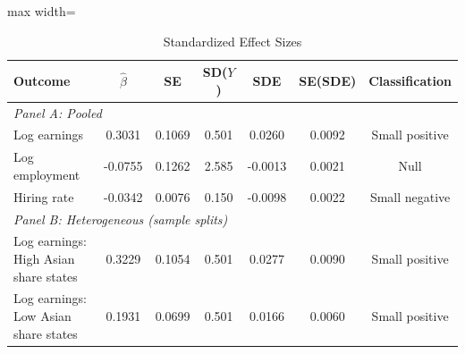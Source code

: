 \begin{table}[H]
\centering
\caption{Standardized Effect Sizes}
\begin{threeparttable}
\begin{adjustbox}{max width=\textwidth}
\begin{tabular}{lcccccc}
\toprule
Outcome & $\hat{\beta}$ & SE & SD($Y$) & SDE & SE(SDE) & Classification \\
\midrule
\multicolumn{7}{l}{\textit{Panel A: Pooled}} \\
Log earnings & 0.3031 & 0.1069 & 0.501 & 0.0260 & 0.0092 & Small positive \\
Log employment & -0.0755 & 0.1262 & 2.585 & -0.0013 & 0.0021 & Null \\
Hiring rate & -0.0342 & 0.0076 & 0.150 & -0.0098 & 0.0022 & Small negative \\
\midrule
\multicolumn{7}{l}{\textit{Panel B: Heterogeneous (sample splits)}} \\
Log earnings: High Asian share states & 0.3229 & 0.1054 & 0.501 & 0.0277 & 0.0090 & Small positive \\
Log earnings: Low Asian share states & 0.1931 & 0.0699 & 0.501 & 0.0166 & 0.0060 & Small positive \\
\bottomrule
\end{tabular}
\end{adjustbox}
\end{threeparttable}
\par\vspace{0.5em}

\end{table}
